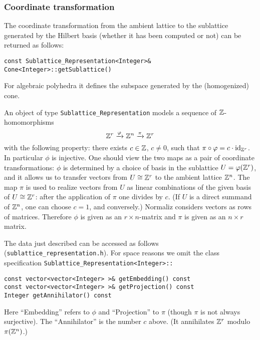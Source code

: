 \begin{small}
\subsubsection{Coordinate transformation}\label{coord}

The coordinate transformation from the ambient lattice to the sublattice generated by the Hilbert basis (whether it has been computed or not) can be returned as follows:
\begin{Verbatim}
const Sublattice_Representation<Integer>& Cone<Integer>::getSublattice()
\end{Verbatim}
For algebraic polyhedra it defines the subspace generated by the (homogenized) cone.

An object of type \verb|Sublattice_Representation| models a sequence of ${\mathbb Z}$-homomorphisms
$$
{\mathbb Z}^r\xrightarrow{\varphi}{\mathbb Z}^n\xrightarrow{\pi}{\mathbb Z}^r
$$
with the following property: there exists $c\in{\mathbb Z}$, $c\neq 0$, such that $\pi\circ \varphi=c\cdot\operatorname{id}_{{\mathbb Z}^r}$. In particular $\phi$ is injective. One should view the two maps as a pair of coordinate transformations: $\phi$ is determined by a choice of basis in the sublattice $U=\varphi({\mathbb Z}^r)$, and it allows us to transfer vectors from $U\cong {\mathbb Z}^r$ to the ambient lattice ${\mathbb Z}^n$. The map $\pi$ is used to realize vectors from $U$ as linear combinations of the given basis of $U\cong{\mathbb Z}^r$: after the application of $\pi$ one divides by $c$. (If $U$ is a direct summand of ${\mathbb Z}^n$, one can choose $c=1$, and conversely.) Normaliz considers vectors as rows of matrices. Therefore $\phi$ is given as an $r\times n$-matrix and $\pi$ is given as an $n\times r$ matrix.

The data just described can be accessed as follows (\verb|sublattice_representation.h|). For space reasons we omit the class specification \verb|Sublattice_Representation<Integer>::|
\begin{Verbatim}
const vector<vector<Integer> >& getEmbedding() const
const vector<vector<Integer> >& getProjection() const
Integer getAnnihilator() const
\end{Verbatim}
Here ``Embedding'' refers to $\phi$ and ``Projection'' to $\pi$ (though $\pi$ is not always surjective). The ``Annihilator'' is the number $c$ above. (It annihilates ${\mathbb Z}^r$ modulo $\pi({\mathbb Z}^n)$.)


\end{small}
